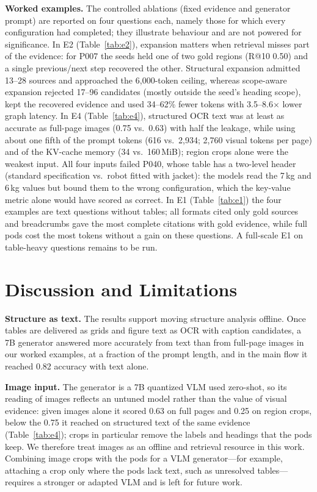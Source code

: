 \documentclass[conference]{IEEEtran}
\begin{document}
\textbf{Worked examples.} The controlled ablations (fixed evidence and generator prompt) are reported on four questions each, namely those for which every configuration had completed; they illustrate behaviour and are not powered for significance. In E2 (Table~\ref{tab:e2}), expansion matters when retrieval misses part of the evidence: for P007 the seeds held one of two gold regions (R@10 0.50) and a single previous/next step recovered the other. Structural expansion admitted 13--28 sources and approached the 6{,}000-token ceiling, whereas scope-aware expansion rejected 17--96 candidates (mostly outside the seed's heading scope), kept the recovered evidence and used 34--62\% fewer tokens with 3.5--8.6$\times$ lower graph latency. In E4 (Table~\ref{tab:e4}), structured OCR text was at least as accurate as full-page images (0.75 vs.\ 0.63) with half the leakage, while using about one fifth of the prompt tokens (616 vs.\ 2{,}934; 2{,}760 visual tokens per page) and of the KV-cache memory (34 vs.\ 160\,MiB); region crops alone were the weakest input. All four inputs failed P040, whose table has a two-level header (standard specification vs.\ robot fitted with jacket): the models read the 7\,kg and 6\,kg values but bound them to the wrong configuration, which the key-value metric alone would have scored as correct. In E1 (Table~\ref{tab:e1}) the four examples are text questions without tables; all formats cited only gold sources and breadcrumbs gave the most complete citations with gold evidence, while full pods cost the most tokens without a gain on these questions. A full-scale E1 on table-heavy questions remains to be run.



\section{Discussion and Limitations}
\textbf{Structure as text.} The results support moving structure analysis offline. Once tables are delivered as grids and figure text as OCR with caption candidates, a 7B generator answered more accurately from text than from full-page images in our worked examples, at a fraction of the prompt length, and in the main flow it reached 0.82 accuracy with text alone. 

\textbf{Image input.} The generator is a 7B quantized VLM used zero-shot, so its reading of images reflects an untuned model rather than the value of visual evidence: given images alone it scored 0.63 on full pages and 0.25 on region crops, below the 0.75 it reached on structured text of the same evidence (Table~\ref{tab:e4}); crops in particular remove the labels and headings that the pods keep. We therefore treat images as an offline and retrieval resource in this work. Combining image crops with the pods for a VLM generator---for example, attaching a crop only where the pods lack text, such as unresolved tables---requires a stronger or adapted VLM and is left for future work.
\end{document}

